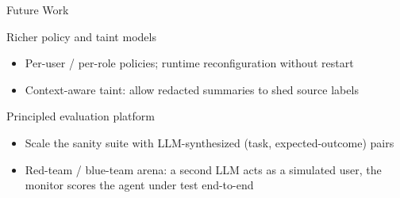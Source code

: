 \documentclass[aspectratio=169]{beamer}
\begin{document}
\begin{frame}{Future Work}
  \begin{block}{Richer policy and taint models}
    \begin{itemize}
      \item Per-user / per-role policies; runtime reconfiguration without restart
      \item Context-aware taint: allow redacted summaries to shed source labels
    \end{itemize}
  \end{block}
  \pause
  \vspace{0.5em}
  \begin{block}{Principled evaluation platform}
    \begin{itemize}
      \item Scale the sanity suite with LLM-synthesized (task, expected-outcome) pairs
      \item Red-team / blue-team arena: a second LLM acts as a simulated user,
            the monitor scores the agent under test end-to-end
    \end{itemize}
  \end{block}
\end{frame}
\end{document}
